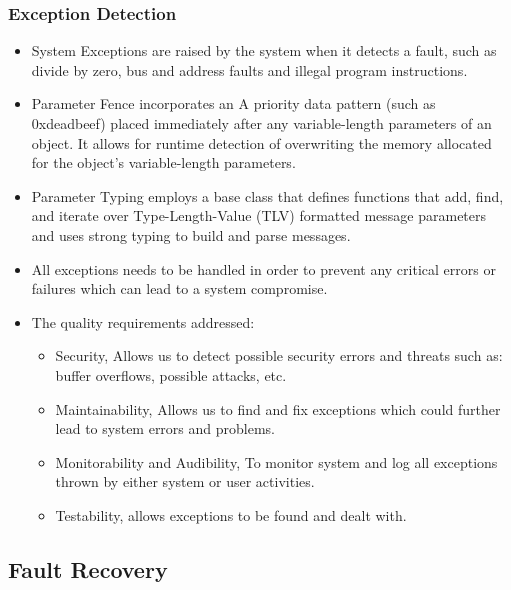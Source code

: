 \documentclass[12pt, oneside]{article}
\begin{document}
		\subsubsection{ Exception Detection }
			\begin{itemize}
			\item System Exceptions are raised by the system when it detects a fault, such as divide by zero, bus and address faults and illegal program instructions.
			
			\item Parameter Fence incorporates an A priority data pattern (such as 0xdeadbeef) placed immediately after any variable-length parameters of an object. It allows for runtime detection of overwriting the memory allocated for the object's variable-length parameters.
			
			\item Parameter Typing employs a base class that defines functions that add, find, and iterate over Type-Length-Value (TLV) formatted message parameters and uses strong typing to build and parse messages.
			
			\item All exceptions needs to be handled in order to prevent any critical errors or failures which can lead to a system compromise.
			
			\item The quality requirements addressed:
			\begin{itemize}
				\item Security, Allows us to detect possible security errors and threats such as: buffer overflows, possible attacks, etc.
				\item Maintainability, Allows us to find and fix exceptions which could further lead to system errors and problems.
				\item Monitorability and Audibility, To monitor system and log all exceptions thrown by either system or user activities.
				\item Testability, allows exceptions to be found and dealt with.
			\end{itemize}
		\end{itemize}

	\subsection{Fault Recovery}
		
		
\end{document}
